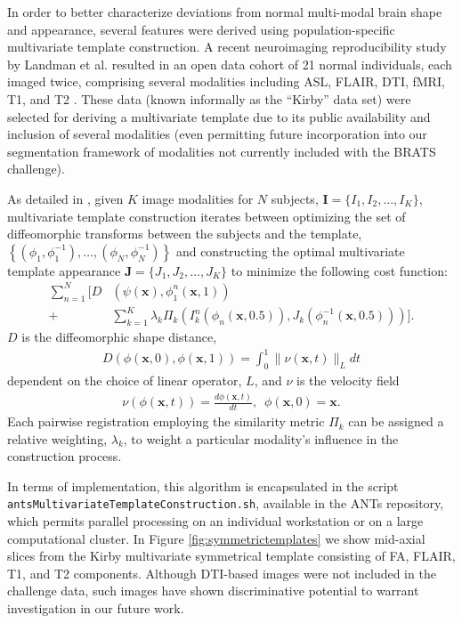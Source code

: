 \documentclass[final,5p,times,twocolumn]{elsarticle}
\begin{document}
In order to better characterize deviations from normal
multi-modal brain shape and appearance, several features were derived 
using population-specific multivariate template 
construction. A recent neuroimaging reproducibility study
by Landman et al. resulted in an open data cohort of 21
normal individuals, each imaged twice, comprising several
modalities including ASL, FLAIR, DTI, fMRI, T1, and T2 
\cite{landman2011}.  These data (known informally as the
``Kirby'' data set) were selected for deriving
a multivariate template due to its public availability and
inclusion of several modalities (even permitting future 
incorporation into our segmentation framework of modalities 
not currently included with the BRATS challenge).

As detailed in \cite{avants2008,avants2010}, 
given $K$ image modalities for $N$ subjects,  
${\mathbf I} = \{I_1,I_2,\ldots, I_K\}$, multivariate 
template construction iterates between optimizing the set 
of diffeomorphic transforms between the subjects and the 
template, 
$\left\{\left(\phi_1,\phi_1^{-1}\right),\ldots,\left(\phi_N,\phi_N^{-1}\right)\right\}$ 
and constructing the 
optimal multivariate template appearance 
$\mathbf{J}=\{J_1,J_2,\ldots, J_K\}$ to minimize the
following cost function:
\begin{align}
  \sum_{n=1}^N 
        \Bigg[ D &\left( \psi(\mathbf{x}),\phi_1^n(\mathbf{x},1)\right) \\ \nonumber 
        +& \sum_{k=1}^K \lambda_k \Pi_k \left(I_k^n\left(\phi_n(\mathbf{x},0.5)\right),J_k\left(\phi^{-1}_n(\mathbf{x},0.5)\right)\right)\Bigg].
\end{align}
$D$ is the diffeomorphic shape distance,
\begin{align}
D\left( \phi( \mathbf{x},0),\phi( \mathbf{x},1)\right) = \int_0^1 \| \nu(\mathbf{x},t)\|_L dt
\end{align}
dependent on the choice of linear operator, $L$, and $\nu$
is the velocity field
\begin{align}
\nu\left( \phi(\mathbf{x},t) \right) = \frac{d\phi(\mathbf{x},t)}{dt},\,\,\, \phi(\mathbf{x},0) = \mathbf{x}.
\end{align}
Each pairwise registration employing the similarity metric $\Pi_k$ can 
be assigned a relative weighting, $\lambda_k$, to weight a particular
modality's influence in the construction process.  

In terms of implementation, this algorithm is 
encapsulated in the script \verb#antsMultivariateTemplateConstruction.sh#,
available in the ANTs repository, which permits parallel processing on
an individual workstation or on a large computational cluster.  In
Figure \ref{fig:symmetrictemplates} we show mid-axial slices from
the Kirby multivariate symmetrical template consisting of FA, FLAIR,  
T1, and T2 components.  Although DTI-based images were not included in the
challenge data, such images have shown discriminative potential 
\citep[e.g.][]{price2003} to warrant investigation in our future work.
\end{document}
